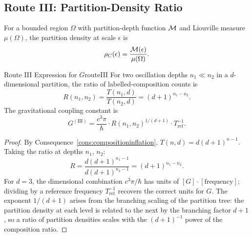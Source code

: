 \subsection{Route III: Partition-Density Ratio}
\label{sec:ch20-routeIII}

\begin{definition}\label{def:partitiondensity}
For a bounded region $\Omega$ with partition-depth function $\mathcal{M}$ and
Liouville measure $\mu(\Omega)$, the partition density at scale $\epsilon$ is
\begin{equation}
  \rho_{C}(\epsilon) = \frac{\mathcal{M}(\epsilon)}{\mu(\Omega)}.
\end{equation}
\end{definition}

\begin{consequence}{Route III Expression for $G$}{routeIII}
  For two oscillation depths $n_{1} \ll n_{2}$ in a $d$-dimensional partition,
  the ratio of labelled-composition counts is
  \begin{equation}
    R(n_{1},n_{2}) = \frac{T(n_{1},d)}{T(n_{2},d)} = (d+1)^{n_{1}-n_{2}}.
  \end{equation}
  The gravitational coupling constant is
  \begin{equation}\label{eq:GrouteIII}
    G^{(\mathrm{III})} = \frac{c^{3}\pi}{\hbar}
                         \cdot R(n_{1},n_{2})^{1/(d+1)}
                         \cdot T_{\mathrm{ref}}^{-1}.
  \end{equation}
\end{consequence}

\begin{proof}
By Consequence~\ref{cons:compositioninflation}, $T(n,d) = d(d+1)^{n-1}$.
Taking the ratio at depths $n_{1}$, $n_{2}$:
\begin{equation}
  R = \frac{d(d+1)^{n_{1}-1}}{d(d+1)^{n_{2}-1}} = (d+1)^{n_{1}-n_{2}}.
\end{equation}
For $d = 3$, the dimensional combination $c^{3}\pi/\hbar$ has units of
$[G]\cdot[\mathrm{frequency}]$; dividing by a reference frequency
$T_{\mathrm{ref}}^{-1}$ recovers the correct units for $G$.
The exponent $1/(d+1)$ arises from the branching scaling of the partition tree:
the partition density at each level is related to the next by the branching
factor $d+1$, so a ratio of partition densities scales with the
$(d+1)^{-1}$ power of the composition ratio.
\end{proof}


